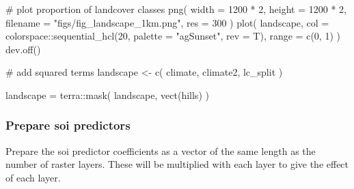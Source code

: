 \documentclass[
]{article}
\newenvironment{Shaded}{}{}
\newcommand{\CommentTok}[1]{\textcolor[rgb]{0.00,0.50,0.00}{#1}}
\newcommand{\DataTypeTok}[1]{#1}
\newcommand{\DecValTok}[1]{#1}
\newcommand{\KeywordTok}[1]{\textcolor[rgb]{0.00,0.00,1.00}{#1}}
\newcommand{\NormalTok}[1]{#1}
\newcommand{\OperatorTok}[1]{#1}
\newcommand{\StringTok}[1]{\textcolor[rgb]{0.00,0.50,0.50}{#1}}
\begin{document}
\begin{Shaded}
\begin{Highlighting}[]
\CommentTok{# plot proportion of landcover classes}
\KeywordTok{png}\NormalTok{(}
  \DataTypeTok{width =} \DecValTok{1200} \OperatorTok{*}\StringTok{ }\DecValTok{2}\NormalTok{, }\DataTypeTok{height =} \DecValTok{1200} \OperatorTok{*}\StringTok{ }\DecValTok{2}\NormalTok{, }\DataTypeTok{filename =} \StringTok{"figs/fig_landscape_1km.png"}\NormalTok{,}
  \DataTypeTok{res =} \DecValTok{300}
\NormalTok{)}
\KeywordTok{plot}\NormalTok{(}
\NormalTok{  landscape,}
  \DataTypeTok{col =}\NormalTok{ colorspace}\OperatorTok{::}\KeywordTok{sequential_hcl}\NormalTok{(}\DecValTok{20}\NormalTok{, }\DataTypeTok{palette =} \StringTok{"agSunset"}\NormalTok{, }\DataTypeTok{rev =}\NormalTok{ T),}
  \DataTypeTok{range =} \KeywordTok{c}\NormalTok{(}\DecValTok{0}\NormalTok{, }\DecValTok{1}\NormalTok{)}
\NormalTok{)}
\KeywordTok{dev.off}\NormalTok{()}
\end{Highlighting}
\end{Shaded}

\begin{Shaded}
\begin{Highlighting}[]
\CommentTok{# add squared terms}
\NormalTok{landscape <-}\StringTok{ }\KeywordTok{c}\NormalTok{(}
\NormalTok{  climate, climate2, lc_split}
\NormalTok{)}

\NormalTok{landscape =}\StringTok{ }\NormalTok{terra}\OperatorTok{::}\KeywordTok{mask}\NormalTok{(}
\NormalTok{  landscape,}
  \KeywordTok{vect}\NormalTok{(hills)}
\NormalTok{)}
\end{Highlighting}
\end{Shaded}

\hypertarget{prepare-soi-predictors}{%
\subsubsection{Prepare soi predictors}\label{prepare-soi-predictors}}

Prepare the soi predictor coefficients as a vector of the same length as the number of raster layers.
These will be multiplied with each layer to give the effect of each layer.
\end{document}
